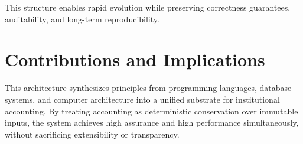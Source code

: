 \documentclass[11pt]{article}
\begin{document}
This structure enables rapid evolution while preserving correctness guarantees,
auditability, and long-term reproducibility.

\section{Contributions and Implications}

This architecture synthesizes principles from programming languages, database systems,
and computer architecture into a unified substrate for institutional accounting. By
treating accounting as deterministic conservation over immutable inputs, the system
achieves high assurance and high performance simultaneously, without sacrificing
extensibility or transparency.
\end{document}
